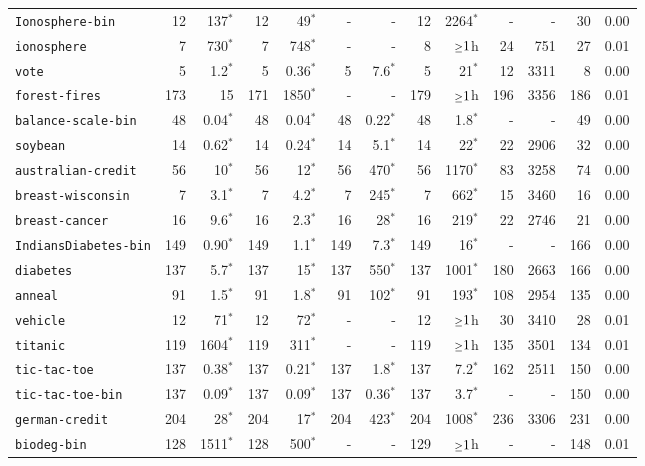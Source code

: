 \begin{tabular}{lrrrrrrrrrrrr}
\texttt{Ionosphere-bin} & 12 & 137$^*$ & 12 & 49$^*$ & - & - & 12 & 2264$^*$ & - & - & 30 & 0.00\\
\texttt{ionosphere} & 7 & 730$^*$ & 7 & 748$^*$ & - & - & 8 & $\mathsmaller{\geq}1$h & 24 & 751 & 27 & 0.01\\
\texttt{vote} & 5 & 1.2$^*$ & 5 & 0.36$^*$ & 5 & 7.6$^*$ & 5 & 21$^*$ & 12 & 3311 & 8 & 0.00\\
\texttt{forest-fires} & 173 & 15 & 171 & 1850$^*$ & - & - & 179 & $\mathsmaller{\geq}1$h & 196 & 3356 & 186 & 0.01\\
\texttt{balance-scale-bin} & 48 & 0.04$^*$ & 48 & 0.04$^*$ & 48 & 0.22$^*$ & 48 & 1.8$^*$ & - & - & 49 & 0.00\\
\texttt{soybean} & 14 & 0.62$^*$ & 14 & 0.24$^*$ & 14 & 5.1$^*$ & 14 & 22$^*$ & 22 & 2906 & 32 & 0.00\\
\texttt{australian-credit} & 56 & 10$^*$ & 56 & 12$^*$ & 56 & 470$^*$ & 56 & 1170$^*$ & 83 & 3258 & 74 & 0.00\\
\texttt{breast-wisconsin} & 7 & 3.1$^*$ & 7 & 4.2$^*$ & 7 & 245$^*$ & 7 & 662$^*$ & 15 & 3460 & 16 & 0.00\\
\texttt{breast-cancer} & 16 & 9.6$^*$ & 16 & 2.3$^*$ & 16 & 28$^*$ & 16 & 219$^*$ & 22 & 2746 & 21 & 0.00\\
\texttt{IndiansDiabetes-bin} & 149 & 0.90$^*$ & 149 & 1.1$^*$ & 149 & 7.3$^*$ & 149 & 16$^*$ & - & - & 166 & 0.00\\
\texttt{diabetes} & 137 & 5.7$^*$ & 137 & 15$^*$ & 137 & 550$^*$ & 137 & 1001$^*$ & 180 & 2663 & 166 & 0.00\\
\texttt{anneal} & 91 & 1.5$^*$ & 91 & 1.8$^*$ & 91 & 102$^*$ & 91 & 193$^*$ & 108 & 2954 & 135 & 0.00\\
\texttt{vehicle} & 12 & 71$^*$ & 12 & 72$^*$ & - & - & 12 & $\mathsmaller{\geq}1$h & 30 & 3410 & 28 & 0.01\\
\texttt{titanic} & 119 & 1604$^*$ & 119 & 311$^*$ & - & - & 119 & $\mathsmaller{\geq}1$h & 135 & 3501 & 134 & 0.01\\
\texttt{tic-tac-toe} & 137 & 0.38$^*$ & 137 & 0.21$^*$ & 137 & 1.8$^*$ & 137 & 7.2$^*$ & 162 & 2511 & 150 & 0.00\\
\texttt{tic-tac-toe-bin} & 137 & 0.09$^*$ & 137 & 0.09$^*$ & 137 & 0.36$^*$ & 137 & 3.7$^*$ & - & - & 150 & 0.00\\
\texttt{german-credit} & 204 & 28$^*$ & 204 & 17$^*$ & 204 & 423$^*$ & 204 & 1008$^*$ & 236 & 3306 & 231 & 0.00\\
\texttt{biodeg-bin} & 128 & 1511$^*$ & 128 & 500$^*$ & - & - & 129 & $\mathsmaller{\geq}1$h & - & - & 148 & 0.01\\

\end{tabular}
